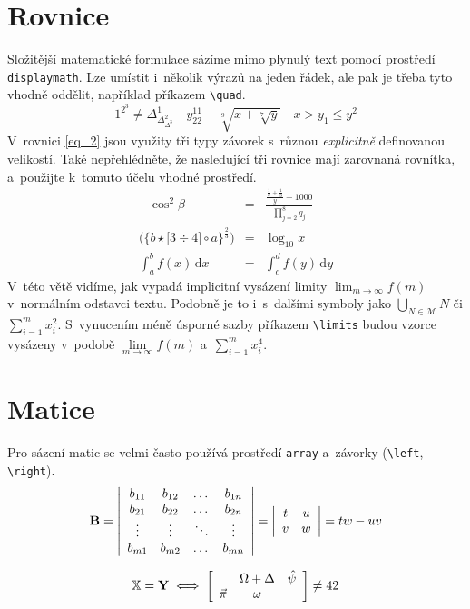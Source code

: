 \documentclass[11pt, twocolumn, a4paper]{article}
\begin{document}
\section{Rovnice}
Složitější matematické formulace sázíme mimo plynulý text pomocí prostředí \verb|displaymath|.
Lze umístit i~několik výrazů na jeden řádek, ale pak je třeba tyto vhodně oddělit,
například příkazem \verb|\quad|.
$$
1^{2^3} \neq \Delta^1_{\Delta^2_{\Delta^3}}
\quad
y^{11}_{22} - \sqrt[9]{x+\sqrt[7]{y}}
\quad
x > y_1 \leq y^2
$$
V~rovnici \eqref{eq_2} jsou využity tři typy závorek s~různou \emph{explicitně}
definovanou velikostí. Také nepřehlédněte, že nasledující tři rovnice mají zarovnaná
rovnítka, a~použijte k~tomuto účelu vhodné prostředí.
\begin{eqnarray}
	\label{eq_1} -\cos^2 \beta & = & \frac{\frac{\frac{1}{x}+\frac{1}{3}}{y}+1000}{\prod\limits _{j=2}^8 q_j} \\
	\label{eq_2} \bigg( \Big\{ b \star \big[ 3 \div 4 \big] \circ a \Big\}^\frac{2}{3}\bigg) & = & \log_{10}x \\
	\label{eq_3} \int_a^b f(x)\,\mathrm{d}x & = & \int_c^d f(y)\,\mathrm{d}y
\end{eqnarray}
V~této větě vidíme, jak vypadá implicitní vysázení limity $\lim_{m \to \infty} f(m)$ v~normálním
odstavci textu. Podobně je to i~s~dalšími symboly jako $\bigcup_{N \in \mathcal{M}} N$ či 
$\sum_{i=1}^{m} x_i^2$. S~vynucením méně úsporné sazby příkazem \verb|\limits|
budou vzorce vysázeny v~podobě $\lim\limits_{m \to \infty} f(m)$
a~$\sum\limits_{i=1}^{m} x_i^4$.

\section{Matice}
Pro sázení matic se velmi často používá prostředí \verb|array| a~závorky (\verb|\left|, \verb|\right|).
$$
\mathbf{B} =
\left|
\begin{array}{c c c c}
	b_{11} & b_{12} & \dots  & b_{1n} \\
	b_{21} & b_{22} & \dots  & b_{2n} \\
	\vdots & \vdots & \ddots & \vdots \\
	b_{m1} & b_{m2} & \dots  & b_{mn} 
\end{array}
\right|
=
\left|
\begin{array}{c c}
	t & u \\
	v & w 
\end{array}
\right|
= tw - uv
$$

$$
\mathbb{X}=\mathbf{Y}\iff\bigg[
	\begin{array}{c c c}
		\phantom{} & \Omega+\Delta & \hat{\psi} \\
		\vec{\pi}  & \omega        & \phantom{} \\
	\end{array}
\bigg]
\neq 42
$$
\end{document}
